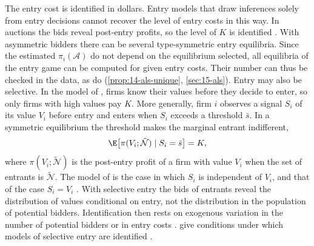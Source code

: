The entry cost is identified in dollars. Entry models that draw inferences solely from entry decisions
cannot recover the level of entry costs in this way. In auctions the bids reveal post-entry profits, so
the level of $K$ is identified \citep[Section 6.3.2]{AtheyHaile2007}. With asymmetric bidders there can be
several type-symmetric entry equilibria. Since the estimated $\pi_i(\mathcal A)$ do not depend on the
equilibrium selected, all equilibria of the entry game can be computed for given entry costs. Their
number can thus be checked in the data, as \citet{AtheyLevinSeira2011} do (\cref{prop:14-als-unique},
\cref{sec:15-als}).
Entry may also be selective. In the model of \citet{Samuelson1985}, firms know their values before
they decide to enter, so only firms with high values pay $K$. More generally, firm $i$ observes a
signal $S_i$ of its value $V_i$ before entry and enters when $S_i$ exceeds a threshold $\bar s$. In a
symmetric equilibrium the threshold makes the marginal entrant indifferent,
\[
\E\big[\pi(V_i;\tilde{\mathcal N})\mid S_i=\bar s\big]=K,
\]
where $\pi(V_i;\tilde{\mathcal N})$ is the post-entry profit of a firm with value $V_i$ when the set of
entrants is $\tilde{\mathcal N}$. The model of \citet{LevinSmith1994} is the case in which $S_i$ is
independent of $V_i$, and that of \citet{Samuelson1985} the case $S_i=V_i$
\citep[p.~92, footnote 9]{HortacsuPerrigne2021}. With selective entry the bids of entrants reveal the
distribution of values conditional on entry, not the distribution in the population of potential
bidders. Identification then rests on exogenous variation in the number of potential bidders or in
entry costs \citep{MarmerShneyerovXu2013,GentryLi2014,RobertsSweeting2013}. \citet{GentryLi2014} give
conditions under which models of selective entry are identified \citep[footnote 8]{HortacsuPerrigne2021}.

